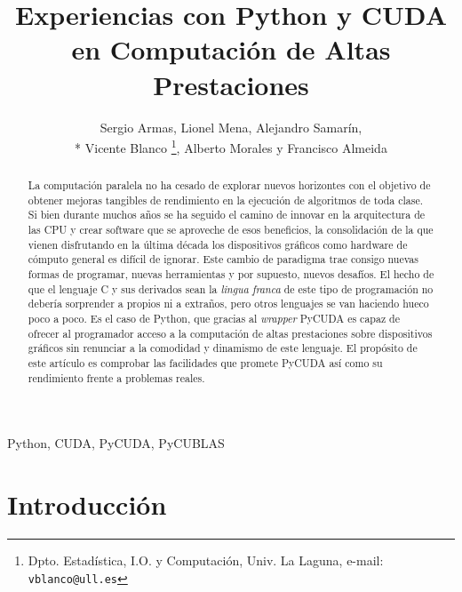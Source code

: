 \documentclass[twocolumn,twoside]{Jornadas}
\begin{document}

\title{Experiencias con Python y CUDA en Computación de Altas Prestaciones}

\author{Sergio Armas, %
     Lionel Mena, %
     Alejandro Samarín,\\*%
     Vicente Blanco %
     \thanks{Dpto. Estadística, I.O. y Computación, Univ. La Laguna, e-mail: {\tt vblanco@ull.es}}, %
     Alberto Morales y %
     Francisco Almeida
}

\maketitle
\markboth{}{}
\pagestyle{empty} 
\thispagestyle{empty} %

\begin{abstract}
La computación paralela no ha cesado de explorar nuevos horizontes con el objetivo de obtener mejoras tangibles de rendimiento en la ejecución de algoritmos de toda clase. Si bien durante muchos años se ha seguido el camino de innovar en la arquitectura de las CPU y crear software que se aproveche de esos beneficios, la consolidación de la que vienen disfrutando en la última década los dispositivos gráficos como hardware de cómputo general es difícil de ignorar. Este cambio de paradigma trae consigo nuevas formas de programar, nuevas herramientas y por supuesto, nuevos desafíos. El hecho de que el lenguaje C y sus derivados sean la \emph{lingua franca} de este tipo de programación no debería sorprender a propios ni a extraños, pero otros lenguajes se van haciendo hueco poco a poco. Es el caso de Python, que gracias al \emph{wrapper} PyCUDA \cite{DBLP:journals/corr/abs-0911-3456} es capaz de ofrecer al programador acceso a la computación de altas prestaciones sobre dispositivos gráficos sin renunciar a la comodidad y dinamismo de este lenguaje. El propósito de este artículo es comprobar las facilidades que promete PyCUDA así como su rendimiento frente a problemas reales.
\end{abstract}

\begin{keywords}
Python, CUDA, PyCUDA, PyCUBLAS
\end{keywords}

\section{Introducción}
\end{document}
